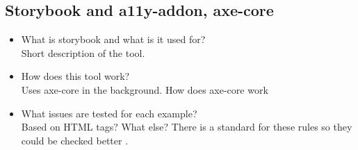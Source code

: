 \documentclass{master_thesis}
\begin{document}
\subsection{Storybook and a11y-addon, axe-core}

\begin{itemize}
	\item What is storybook and what is it used for?\\
	Short description of the tool.
	\item How does this tool work?\\
	Uses axe-core in the background. How does axe-core work
	\item What issues are tested for each example? \\
	Based on HTML tags? What else? There is a standard for these rules so they could be checked better \citep{InitiativeWAI}.
\end{itemize}
\end{document}
